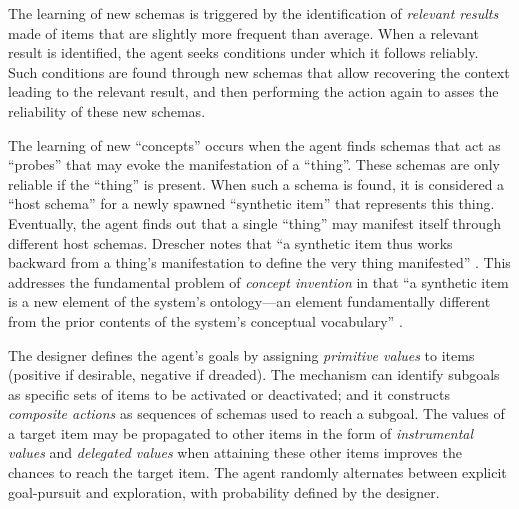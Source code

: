 \documentclass[runningheads]{llncs}
\begin{document}
The learning of new schemas is triggered by the identification of \textit{relevant results} made of items that are slightly more frequent than average. 
When a relevant result is identified, the agent seeks conditions under which it follows reliably. 
Such conditions are found through new schemas that allow recovering the context leading to the relevant result, and then performing the action again to asses the reliability of these new schemas. 

The learning of new ``concepts'' occurs when the agent finds schemas that act as ``probes'' that may evoke the manifestation of a ``thing''. 
These schemas are only reliable if the ``thing'' is present. 
When such a schema is found, it is considered a ``host schema'' for a newly spawned ``synthetic item'' that represents this thing.
Eventually, the agent finds out that a single ``thing'' may manifest itself through different host schemas. 
Drescher notes that ``a synthetic item thus works backward from a thing's manifestation to define the very thing manifested'' \cite[p. 83]{drescher_made-up_1991}.
This addresses the fundamental problem of \textit{concept invention} in that 
``a synthetic item is a new element of the system's ontology---an element fundamentally different from the prior contents of the system's conceptual vocabulary'' \cite[p. 81]{drescher_made-up_1991}.

The designer defines the agent's goals by assigning \textit{primitive values} to items (positive if desirable, negative if dreaded).
The mechanism can identify subgoals as specific sets of items to be activated or deactivated; 
and it constructs \textit{composite actions} as sequences of schemas used to reach a subgoal.
The values of a target item may be propagated to other items in the form of \textit{instrumental values} and \textit{delegated values} when attaining these other items improves the chances to reach the target item. 
The agent randomly alternates between explicit goal-pursuit and exploration, with probability defined by the designer.

\end{document}
